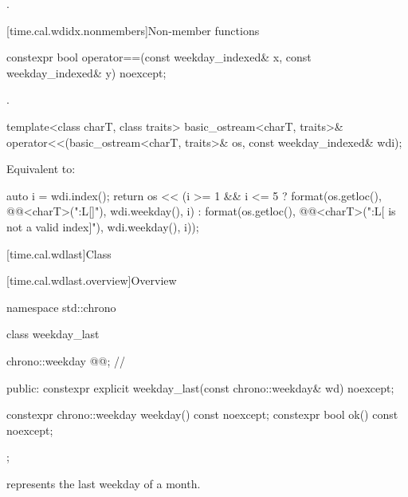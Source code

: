 \begin{itemdescr}
\pnum
\returns
{}.
\end{itemdescr}

[time.cal.wdidx.nonmembers]{Non-member functions}

%
\begin{itemdecl}
constexpr bool operator==(const weekday_indexed& x, const weekday_indexed& y) noexcept;
\end{itemdecl}

\begin{itemdescr}
\pnum
\returns
{}.
\end{itemdescr}

%
\begin{itemdecl}
template<class charT, class traits>
  basic_ostream<charT, traits>&
    operator<<(basic_ostream<charT, traits>& os, const weekday_indexed& wdi);
\end{itemdecl}

\begin{itemdescr}
\pnum
\effects
Equivalent to:
\begin{codeblock}
auto i = wdi.index();
return os << (i >= 1 && i <= 5 ?
  format(os.getloc(), @@<charT>("{:L}[{}]"), wdi.weekday(), i) :
  format(os.getloc(), @@<charT>("{:L}[{} is not a valid index]"),
         wdi.weekday(), i));
\end{codeblock}
\end{itemdescr}

[time.cal.wdlast]{Class }

[time.cal.wdlast.overview]{Overview}

\begin{codeblock}
namespace std::chrono {
  class weekday_last {
    chrono::weekday @@;                // \expos

  public:
    constexpr explicit weekday_last(const chrono::weekday& wd) noexcept;

    constexpr chrono::weekday weekday() const noexcept;
    constexpr bool ok() const noexcept;
  };
}
\end{codeblock}

\pnum
{} represents the last weekday of a month.

